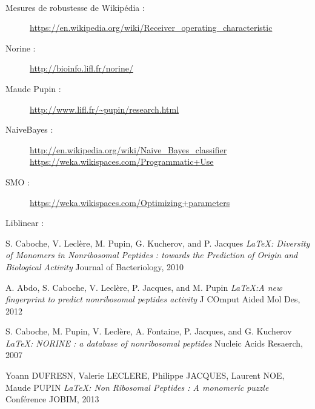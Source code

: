 \documentclass[a4paper,10pt]{report}
\begin{document}
      \paragraph{}
      \begin{description}
       \item [Mesures de robustesse de Wikipédia :]
	\url{https://en.wikipedia.org/wiki/Receiver_operating_characteristic}
	
	\item [Norine :] 
	  \url{http://bioinfo.lifl.fr/norine/}
	
	\item [Maude Pupin :]
	  \url {http://www.lifl.fr/~pupin/research.html}
	 
	\item [NaiveBayes :]
	  \url {http://en.wikipedia.org/wiki/Naive_Bayes_classifier}\\
	  \url {https://weka.wikispaces.com/Programmatic+Use}
	
	\item [SMO :] 
	  \url{https://weka.wikispaces.com/Optimizing+parameters}
	
	\item [Liblinear :]
	  
	\end{description}
	\begin{thebibliography}{9}
      
	  S. Caboche, V. Leclère, M. Pupin, G. Kucherov, and P. Jacques
	  \emph{\LaTeX : Diversity of Monomers in Nonribosomal Peptides : towards the Prediction of Origin and Biological Activity}
	  Journal of Bacteriology,
	  2010
	 
	  A. Abdo, S. Caboche, V. Leclère, P. Jacques, and M. Pupin
	  \emph{\LaTeX :A new fingerprint to predict nonribosomal peptides activity }
	  J COmput Aided Mol Des,
	  2012
	  
	 S. Caboche, M. Pupin, V. Leclère, A. Fontaine, P. Jacques, and G. Kucherov
	 \emph{\LaTeX : NORINE : a database of nonribosomal peptides}
	 Nucleic Acids Resaerch,
	 2007
	 
	 Yoann DUFRESN, Valerie LECLERE, Philippe JACQUES, Laurent NOE, Maude PUPIN
	 \emph{\LaTeX : Non Ribosomal Peptides : A monomeric puzzle}
	 Conférence JOBIM,
	 2013
     \end{thebibliography}
     
     
    \newpage

    

  
\end{document}
